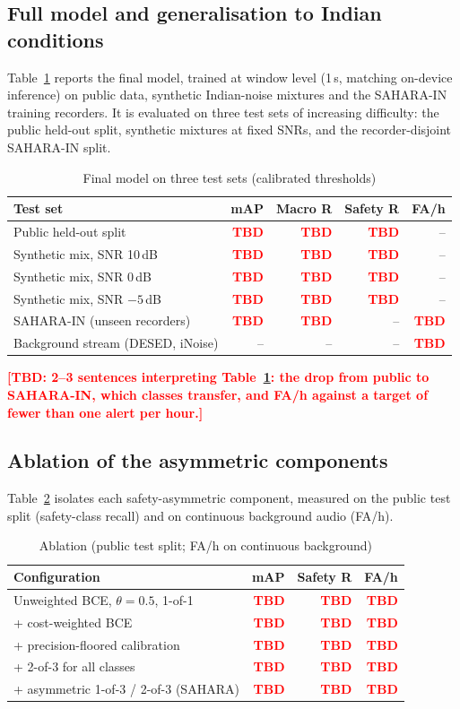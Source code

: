 \documentclass[conference]{IEEEtran}
\newcommand{\TBD}[1]{\textcolor{red}{\textbf{[TBD: #1]}}}
\newcommand{\tbd}{\textcolor{red}{\textbf{TBD}}}
\begin{document}
\subsection{Full model and generalisation to Indian conditions}
Table~\ref{tab:full} reports the final model, trained at window level (1\,s, matching on-device inference) on public data, synthetic Indian-noise mixtures and the SAHARA-IN training recorders. It is evaluated on three test sets of increasing difficulty: the public held-out split, synthetic mixtures at fixed SNRs, and the recorder-disjoint SAHARA-IN split.

\begin{table}[t]
\caption{Final model on three test sets (calibrated thresholds)}
\label{tab:full}
\centering\footnotesize
\setlength{\tabcolsep}{3.5pt}
\begin{tabular}{@{}lrrrr@{}}
\toprule
Test set & mAP & Macro R & Safety R & FA/h \\
\midrule
Public held-out split & \tbd & \tbd & \tbd & -- \\
Synthetic mix, SNR 10\,dB & \tbd & \tbd & \tbd & -- \\
Synthetic mix, SNR 0\,dB & \tbd & \tbd & \tbd & -- \\
Synthetic mix, SNR $-5$\,dB & \tbd & \tbd & \tbd & -- \\
SAHARA-IN (unseen recorders) & \tbd & \tbd & -- & \tbd \\
Background stream (DESED, iNoise) & -- & -- & -- & \tbd \\
\bottomrule
\end{tabular}
\end{table}

\TBD{2--3 sentences interpreting Table~\ref{tab:full}: the drop from public to SAHARA-IN, which classes transfer, and FA/h against a target of fewer than one alert per hour.}

\subsection{Ablation of the asymmetric components}
Table~\ref{tab:ablation} isolates each safety-asymmetric component, measured on the public test split (safety-class recall) and on continuous background audio (FA/h).

\begin{table}[t]
\caption{Ablation (public test split; FA/h on continuous background)}
\label{tab:ablation}
\centering\footnotesize
\setlength{\tabcolsep}{3.5pt}
\begin{tabular}{@{}lrrr@{}}
\toprule
Configuration & mAP & Safety R & FA/h \\
\midrule
Unweighted BCE, $\theta=0.5$, 1-of-1 & \tbd & \tbd & \tbd \\
+ cost-weighted BCE & \tbd & \tbd & \tbd \\
+ precision-floored calibration & \tbd & \tbd & \tbd \\
+ 2-of-3 for all classes & \tbd & \tbd & \tbd \\
+ asymmetric 1-of-3 / 2-of-3 (SAHARA) & \tbd & \tbd & \tbd \\
\bottomrule
\end{tabular}
\end{table}
\end{document}
